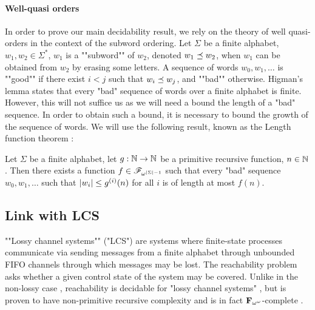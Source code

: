 \paragraph*{Well-quasi orders}

In order to prove our main decidability result, we rely on the theory of well quasi-orders in the context of the subword ordering.
Let $\Sigma$ be a finite alphabet, $w_1, w_2 \in \Sigma^*$, $w_1$ is a ""subword"" of $w_2$, denoted $w_1 \preceq w_2$, when $w_1$ can be obtained from $w_2$ by erasing some letters. 
A sequence of words $w_0, w_1, \ldots$ is ""good"" if there exist $i<j$ such that $w_i \preceq w_j$, and ""bad"" otherwise. Higman's lemma \cite{Higman52} states that every "bad" sequence of words over a finite alphabet is finite.
However, this will not suffice us as we will need a bound the length of a "bad" sequence. In order to obtain such a bound, it is necessary to bound the growth of the sequence of words. 
We will use the following result, known as the Length function theorem \cite{SchmitzS2011upperHigman}:

\begin{theorem}
	\label{thm:lengthfcttheorem}
	Let $\Sigma$ be a finite alphabet, let $g : \mathbb{N} \to \mathbb{N}$ be a primitive recursive function, $n\in \mathbb{N}$.
	Then there exists a function $f \in \mathscr{F}_{\omega^{|\Sigma| - 1}}$ such that every "bad" sequence $w_0, w_1, \ldots$ such that $|w_i| \leq g^{(i)}(n)$ for all $i$ is of length at most $f(n)$. 
\end{theorem}



\subsection{Link with LCS}

""Lossy channel systems"" ("LCS") are systems where finite-state processes communicate via sending messages from a finite alphabet through unbounded FIFO channels through which messages may be lost. The reachability problem asks whether a given control state of the system may be covered. Unlike in the non-lossy case \cite{BZ83}, reachability is decidable for "lossy channel systems" \cite{AbdullaK95}, but is proven to have non-primitive recursive complexity \cite{Schnoebelen2002verifying} and is in fact $\mathbf{F}_{\omega^{\omega}}$-complete \cite{ChambartS08ordinal}.

